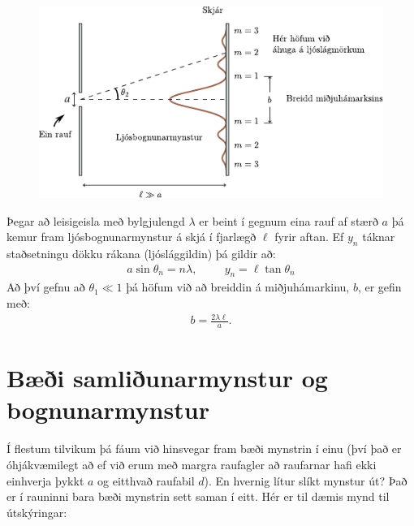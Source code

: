 \ifdefined \wholebook \else\documentclass[oneside]{book}\usepackage{EdlBook}\graphicspath{{figures/}}
\begin{document}
\begin{figure}[H]
    \centering
    \includegraphics{figures/ljosbognun.pdf}
\end{figure}

\begin{tcolorbox}
Þegar að leisigeisla með bylgjulengd $\lambda$ er beint í gegnum eina rauf af stærð $a$ þá kemur fram ljósbognunarmynstur á skjá í fjarlægð $\ell$ fyrir aftan. Ef $y_n$ táknar staðsetningu dökku rákana (ljóslággildin) þá gildir að:
\begin{align*}
    a\sin\theta_n = n\lambda, \hspace{1cm} y_n = \ell \tan\theta_n
\end{align*}
Að því gefnu að $\theta_1 \ll 1$ þá höfum við að breiddin á miðjuhámarkinu, $b$, er gefin með:
\begin{align*}
    b = \frac{2\lambda \ell}{a}.
\end{align*}
\end{tcolorbox}


\section{Bæði samliðunarmynstur og bognunarmynstur}

Í flestum tilvikum þá fáum við hinsvegar fram bæði mynstrin í einu (því það er óhjákvæmilegt að ef við erum með margra raufagler að raufarnar hafi ekki einhverja þykkt $a$ og eitthvað raufabil $d$). En hvernig lítur slíkt mynstur út? Það er í rauninni bara bæði mynstrin sett saman í eitt. Hér er til dæmis mynd til útskýringar:
\end{document}
